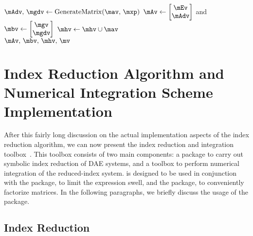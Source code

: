 \begin{breakablealgorithm}
\begin{algorithmic}[1]
        \State $\mAdv, \, \mgdv \gets \mathrm{GenerateMatrix}(\mav, \, \mxp)$ 
        \State $\mAv \gets \begin{bmatrix} \mEv \\ \mAdv \end{bmatrix}$ and $\mbv \gets \begin{bmatrix} \mgv \\ \mgdv \end{bmatrix}$
        \State $\mhv \gets \mhv \cup \mav$ 
      \EndWhile \\
      \Return $\mAv, \, \mbv, \, \mhv, \, \mv$ 
    \EndProcedure
  \end{algorithmic}
\end{breakablealgorithm}


\section{Index Reduction Algorithm and Numerical Integration Scheme Implementation}
\label{chap3:sec:indigo}

After this fairly long discussion on the actual implementation aspects of the index reduction algorithm, we can now present the \Indigo{} index reduction and integration toolbox~\cite{indigo}. This toolbox consists of two main components: a \Maple{} package to carry out symbolic index reduction of \ac{DAE} systems, and a \Matlab{} toolbox to perform numerical integration of the reduced-index system. \Indigo{} is designed to be used in conjunction with the \LEM{} package, to limit the expression swell, and the \LAST{} package, to conveniently factorize matrices. In the following paragraphs, we briefly discuss the usage of the \Indigo{} package.

\subsection{Index Reduction}

